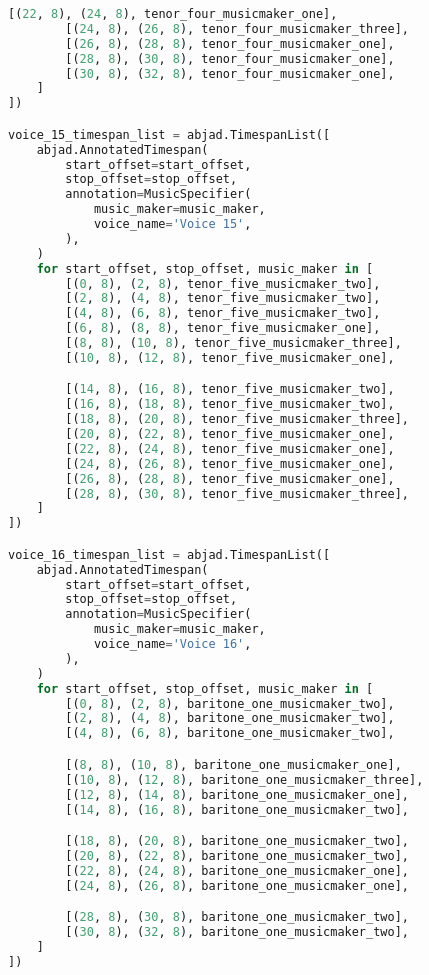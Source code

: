 \begin{lstlisting}[language=Python, caption=Invocation Source Code]
        [(22, 8), (24, 8), tenor_four_musicmaker_one],
        [(24, 8), (26, 8), tenor_four_musicmaker_three],
        [(26, 8), (28, 8), tenor_four_musicmaker_one],
        [(28, 8), (30, 8), tenor_four_musicmaker_one],
        [(30, 8), (32, 8), tenor_four_musicmaker_one],
    ]
])

voice_15_timespan_list = abjad.TimespanList([
    abjad.AnnotatedTimespan(
        start_offset=start_offset,
        stop_offset=stop_offset,
        annotation=MusicSpecifier(
            music_maker=music_maker,
            voice_name='Voice 15',
        ),
    )
    for start_offset, stop_offset, music_maker in [
        [(0, 8), (2, 8), tenor_five_musicmaker_two],
        [(2, 8), (4, 8), tenor_five_musicmaker_two],
        [(4, 8), (6, 8), tenor_five_musicmaker_two],
        [(6, 8), (8, 8), tenor_five_musicmaker_one],
        [(8, 8), (10, 8), tenor_five_musicmaker_three],
        [(10, 8), (12, 8), tenor_five_musicmaker_one],

        [(14, 8), (16, 8), tenor_five_musicmaker_two],
        [(16, 8), (18, 8), tenor_five_musicmaker_two],
        [(18, 8), (20, 8), tenor_five_musicmaker_three],
        [(20, 8), (22, 8), tenor_five_musicmaker_one],
        [(22, 8), (24, 8), tenor_five_musicmaker_one],
        [(24, 8), (26, 8), tenor_five_musicmaker_one],
        [(26, 8), (28, 8), tenor_five_musicmaker_one],
        [(28, 8), (30, 8), tenor_five_musicmaker_three],
    ]
])

voice_16_timespan_list = abjad.TimespanList([
    abjad.AnnotatedTimespan(
        start_offset=start_offset,
        stop_offset=stop_offset,
        annotation=MusicSpecifier(
            music_maker=music_maker,
            voice_name='Voice 16',
        ),
    )
    for start_offset, stop_offset, music_maker in [
        [(0, 8), (2, 8), baritone_one_musicmaker_two],
        [(2, 8), (4, 8), baritone_one_musicmaker_two],
        [(4, 8), (6, 8), baritone_one_musicmaker_two],

        [(8, 8), (10, 8), baritone_one_musicmaker_one],
        [(10, 8), (12, 8), baritone_one_musicmaker_three],
        [(12, 8), (14, 8), baritone_one_musicmaker_one],
        [(14, 8), (16, 8), baritone_one_musicmaker_two],

        [(18, 8), (20, 8), baritone_one_musicmaker_two],
        [(20, 8), (22, 8), baritone_one_musicmaker_two],
        [(22, 8), (24, 8), baritone_one_musicmaker_one],
        [(24, 8), (26, 8), baritone_one_musicmaker_one],

        [(28, 8), (30, 8), baritone_one_musicmaker_two],
        [(30, 8), (32, 8), baritone_one_musicmaker_two],
    ]
])


\end{lstlisting}
